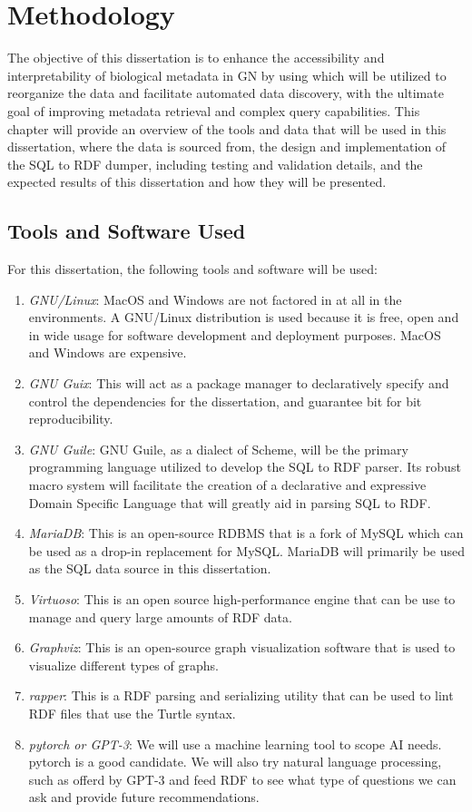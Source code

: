 \section{Methodology}

The objective of this dissertation is to enhance the accessibility and interpretability of biological metadata in GN by using which will be utilized to reorganize the data and facilitate automated data discovery, with the ultimate goal of improving metadata retrieval and complex query capabilities.  This chapter will provide an overview of the tools and data that will be used in this dissertation, where the data is sourced from, the design and implementation of the SQL to RDF dumper, including testing and validation details, and the expected results of this dissertation and how they will be presented.

\subsection{Tools and Software Used}

For this dissertation, the following tools and software will be used:

\begin{enumerate}
\item \textit{GNU/Linux}:  MacOS and Windows are not factored in at all in the environments.  A GNU/Linux distribution is used because it is free, open and in wide usage for software development and deployment purposes.  MacOS and Windows are expensive.
\item \textit{GNU Guix}: This will act as a package manager to declaratively specify and control the dependencies for the dissertation, and guarantee bit for bit reproducibility.
\item \textit{GNU Guile}: GNU Guile, as a dialect of Scheme, will be the primary programming language utilized to develop the SQL to RDF parser. Its robust macro system will facilitate the creation of a declarative and expressive Domain Specific Language that will greatly aid in parsing SQL to RDF.
\item \textit{MariaDB}: This is an open-source RDBMS that is a fork of MySQL which can be used as a drop-in replacement for MySQL.  MariaDB will primarily be used as the SQL data source in this dissertation.
\item \textit{Virtuoso}: This is an open source high-performance engine that can be use to manage and query large amounts of RDF data.
\item \textit{Graphviz}: This is an open-source graph visualization software that is used to visualize different types of graphs.
\item \textit{rapper}: This is a RDF parsing and serializing utility that can be used to lint RDF files that use the Turtle syntax.
\item \textit{pytorch or GPT-3}: We will use a machine learning tool to scope AI needs. pytorch is a good candidate.  We will also try natural language processing, such as offerd by GPT-3 and feed RDF to see what type of questions we can ask and provide future recommendations.
\end{enumerate}

